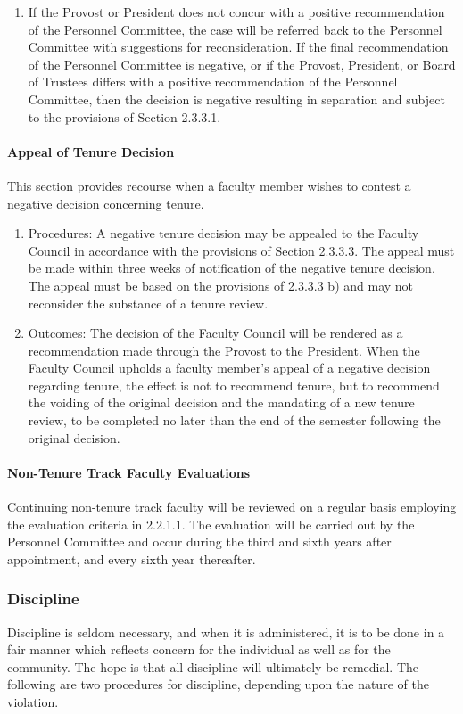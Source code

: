 \documentclass[letterpaper, 11pt]{article}
\begin{document}
\begin{enumerate}[label=\alph*)]
{\begin{enumerate}[label=\arabic*)]
{\begin{enumerate}[label=()\alph*)]
								\end{enumerate}
							}
							\item{If the Provost or President does not concur with a positive recommendation of the Personnel Committee, the case will be referred back to the Personnel Committee with suggestions for reconsideration.  If the final recommendation of the Personnel Committee is negative, or if the Provost, President, or Board of Trustees differs with a positive recommendation of the Personnel Committee, then the decision is negative resulting in separation and subject to the provisions of Section 2.3.3.1.}
						\end{enumerate}
					}
				\end{enumerate}
			\paragraph{Appeal of Tenure Decision}
				This section provides recourse when a faculty member wishes to contest a negative decision concerning tenure.
				\begin{enumerate}[label=\alph*)]
					\item{Procedures:
						A negative tenure decision may be appealed to the Faculty Council in accordance with the provisions of Section 2.3.3.3.  The appeal must be made within three weeks of notification of the negative tenure decision.  The appeal must be based on the provisions of 2.3.3.3 b) and may not reconsider the substance of a tenure review.}
					\item{Outcomes:
						The decision of the Faculty Council will be rendered as a recommendation made through the Provost to the President.  When the Faculty Council upholds a faculty member's appeal of a negative decision regarding tenure, the effect is not to recommend tenure, but to recommend the voiding of the original decision and the mandating of a new tenure review, to be completed no later than the end of the semester following the original decision.}
				\end{enumerate}
			\paragraph{Non-Tenure Track Faculty Evaluations}
				Continuing non-tenure track faculty will be reviewed on a regular basis employing the evaluation criteria in 2.2.1.1.  The evaluation will be carried out by the Personnel Committee and occur during the third and sixth years after appointment, and every sixth year thereafter.
		\subsubsection{Discipline}
			Discipline is seldom necessary, and when it is administered, it is to be done in a fair manner which reflects concern for the individual as well as for the community.  The hope is that all discipline will ultimately be remedial.  The following are two procedures for discipline, depending upon the nature of the violation.
\end{document}
